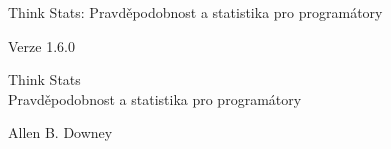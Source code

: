 \documentclass[12pt]{book}
\newcommand{\theversion}{1.6.0}
\begin{document}



\begin{latexonly}

\renewcommand{\blankpage}{\thispagestyle{empty} \quad \newpage}



\thispagestyle{empty}

\begin{flushright}
\vspace*{2.0in}

\begin{spacing}{3}
{\huge Think Stats: Pravděpodobnost a statistika pro programátory}\\
{\Large }
\end{spacing}

\vspace{0.25in}

Verze \theversion

\vfill

\end{flushright}


\blankpage
\blankpage

\pagebreak
\thispagestyle{empty}

\begin{flushright}
\vspace*{2.0in}

\begin{spacing}{3}
{\huge Think Stats}\\
{\Large Pravděpodobnost a statistika pro programátory}
\end{spacing}

\vspace{0.25in}

{\Large
Allen B. Downey\\
}




\end{flushright}
\end{latexonly}
\end{document}

